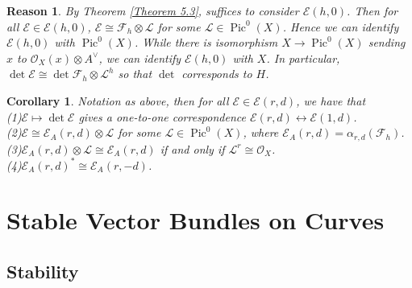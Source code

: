 \documentclass{ctexart}
\newtheorem{reason}{Reason}[section]
\newtheorem{corollary}{Corollary}[section]
\newcommand{\picardscheme}{\operatorname{Pic}}
\begin{document}
\begin{reason}
    By Theorem \ref{Theorem 5.3}, suffices to consider $\mathcal{E}(h, 0)$.
    Then for all $\mathcal{E}\in \mathcal{E}(h, 0)$, $\mathcal{E} \cong \mathcal{F}_{h} \otimes \mathcal{L}$ for some $\mathcal{L}\in \picardscheme^{0}(X)$.
    Hence we can identify $\mathcal{E}(h, 0)$ with $\picardscheme^{0}(X)$.
    While there is isomorphism $X \rightarrow \picardscheme^{0}(X)$ sending $x$ to $\mathcal{O}_{X}(x) \otimes A^{\vee}$,
    we can identify $\mathcal{E}(h, 0)$ with $X$.
    In particular, $\det \mathcal{E} \cong \det \mathcal{F}_{h} \otimes \mathcal{L}^{h}$ so that $\det$ corresponds to $H$. 
\end{reason}
\begin{corollary}
    Notation as above, then for all $\mathcal{E}\in \mathcal{E}(r, d)$, we have that \\
    (1)$\mathcal{E} \mapsto \det \mathcal{E}$ gives a one-to-one correspondence $\mathcal{E}(r, d) \longleftrightarrow \mathcal{E}(1, d)$. \\
    (2)$\mathcal{E} \cong \mathcal{E}_{A}(r, d) \otimes \mathcal{L}$ for some $\mathcal{L}\in \picardscheme^{0}(X)$,
    where $\mathcal{E}_{A}(r, d) = \alpha_{r, d}(\mathcal{F}_{h})$. \\
    (3)$\mathcal{E}_{A}(r, d) \otimes \mathcal{L} \cong \mathcal{E}_{A}(r, d)$ if and only if $\mathcal{L}^{r} \cong \mathcal{O}_{X}$. \\
    (4)$\mathcal{E}_{A}(r, d)^{\ast} \cong \mathcal{E}_{A}(r, -d)$.
    \label{Corollary 5.8}
\end{corollary}

\section{Stable Vector Bundles on Curves}
\label{section:Stable_of_Vector_Bundles_on_Curves}

\subsection{Stability}
\label{subsection:Stable_of_Vector_Bundles_on_Curves_Stability}
\end{document}
